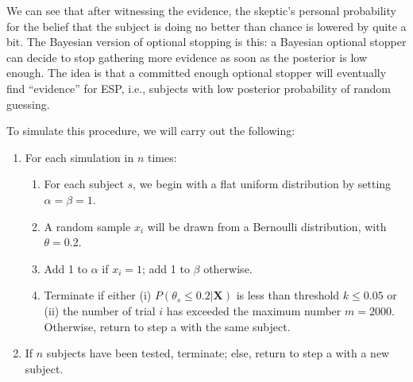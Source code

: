 We can see that after witnessing the evidence, the skeptic's personal
probability for the belief that the subject is doing no better than
chance is lowered by quite a bit. The Bayesian version of optional
stopping is this: a Bayesian optional stopper can decide to stop
gathering more evidence as soon as the posterior is low enough. The idea
is that a committed enough optional stopper will eventually find
``evidence'' for ESP, i.e., subjects with low posterior probability of
random guessing.

To simulate this procedure, we will carry out the following:



\begin{enumerate}
\def\labelenumi{\arabic{enumi}.}
\tightlist
\item
  For each simulation in \(n\) times:

  \begin{enumerate}
  \def\labelenumii{\alph{enumii}.}
  \tightlist
  \item
    For each subject \(s\), we begin with a flat uniform distribution by
    setting \(\alpha = \beta = 1\).
  \item
    A random sample \(x_i\) will be drawn from a Bernoulli distribution,
    with \(\theta = 0.2\).
  \item
    Add 1 to \(\alpha\) if \(x_i =1\); add 1 to \(\beta\) otherwise.
  \item
    Terminate if either (i) \(P(\theta_s \leq 0.2|\mathbf{X})\) is less
    than threshold \(k\leq 0.05\) or (ii) the number of trial \(i\) has exceeded
    the maximum number \(m=2000\). Otherwise, return to step a with the same
    subject.
  \end{enumerate}
\item
  If \(n\) subjects have been tested, terminate; else, return to step a
  with a new subject.

\end{enumerate}



